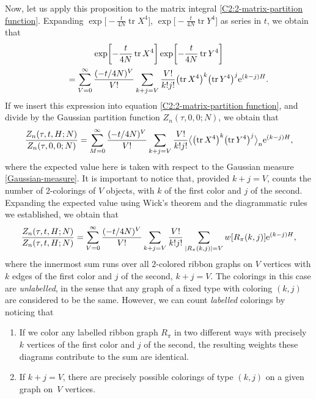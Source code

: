 \documentclass[pdftex]{sigma}
\DeclareMathOperator{\tr}{tr}
\numberwithin{equation}{section}
\begin{document}
Now, let us apply this proposition to the matrix integral \eqref{C2:2-matrix-partition function}.
Expanding $\exp \bigl[-\frac{t}{4N} \tr X^4 \bigr]$, $\exp \bigl[-\frac{t}{4N} \tr Y^4 \bigr]$ as series in $t$, we obtain that
 \begin{gather*}
 \exp \biggl[-\frac{t}{4N} \tr X^4 \biggr]\exp \biggl[-\frac{t}{4N} \tr Y^4 \biggr]\\
 \qquad{}= \sum_{V = 0}^{\infty}\frac{(-t/4N)^V}{V!}\sum_{k+j = V} \frac{V!}{k!j!} \bigl(\tr X^4\bigr)^k \bigl(\tr Y^4\bigr)^j {\rm e}^{(k-j)H}.
 \end{gather*}
If we insert this expression into equation \eqref{C2:2-matrix-partition function}, and divide by the Gaussian partition function
$Z_n(\tau,0,0;N)$, we obtain that
 \begin{equation*}
 \frac{Z_n(\tau,t,H;N)}{Z_n(\tau,0,0;N)} = \sum_{M = 0}^{\infty}\frac{(-t/4N)^V}{V!}\sum_{k+j = V} \frac{V!}{k!j!} \bigl\langle \bigl(\tr X^4\bigr)^k \bigl(\tr Y^4\bigr)^j \bigr\rangle_n {\rm e}^{(k-j)H},
 \end{equation*}
where the expected value here is taken with respect to the Gaussian measure \eqref{Gaussian-measure}.
It is important to notice that, provided $k+j = V$,  counts the number of 2-colorings of $V$ objects, with $k$ of the first color
and $j$ of the second. Expanding the expected value \smash{$\bigl\langle \bigl(\tr X^4\bigr)^k \bigl(\tr Y^4\bigr)^j \bigr\rangle_n$} using Wick's theorem and the diagrammatic rules
we established, we obtain that
 \begin{equation*}
 \frac{Z_n(\tau,t,H;N)}{Z_n(\tau,t,H;N)} = \sum_{V = 0}^{\infty}\frac{(-t/4N)^V}{V!}\sum_{k+j = V} \frac{V!}{k!j!} \sum_{|R_{\pi}(k,j)| = V} w [R_{\pi}(k,j)]{\rm e}^{(k-j)H},
 \end{equation*}
where the innermost sum runs over all $2$-colored ribbon graphs on $V$ vertices with $k$ edges of the first color and $j$ of the second, $k+j = V$.
The colorings in this case are \textit{unlabelled}, in the sense that any graph of a fixed type with coloring $(k,j)$ are considered to be the same.
However, we can count \textit{labelled} colorings by noticing that
 \begin{enumerate}\itemsep=0pt
 \item[$(1)$] If we color any labelled ribbon graph $R_{\pi}$ in two different ways with precisely $k$ vertices of the first color and $j$ of the second, the resulting weights these diagrams contribute to the sum are identical.
 \item[$(2)$] If $k+j = V$, there are precisely  possible colorings of type $(k,j)$ on a given graph on~$V$ vertices.
 \end{enumerate}
\end{document}
